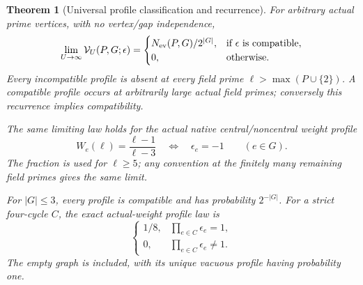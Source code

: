\documentclass[11pt]{article}
\newtheorem{theorem}{Theorem}[section]
\begin{document}
\begin{theorem}[Universal profile classification and recurrence]
\label{thm:native-vanishing-profiles}
For arbitrary actual prime vertices, with no vertex/gap independence,
\begin{equation}\label{eq:native-full-profile-law}
 \lim_{U\to\infty}\mathcal V_U(P,G;\epsilon)
 =
 \begin{cases}
  N_{\rm ev}(P,G)/2^{|G|},&\text{if \(\epsilon\) is compatible},\\
  0,&\text{otherwise}.
 \end{cases}
\end{equation}
Every incompatible profile is absent at every field prime
\(\ell>\max(P\cup\{2\})\).
A compatible profile occurs at arbitrarily large actual field primes;
conversely this recurrence implies compatibility.

The same limiting law holds for the actual native central/noncentral
weight profile
\[
 W_e(\ell)=\frac{\ell-1}{\ell-3}
       \quad\Longleftrightarrow\quad\epsilon_e=-1
       \qquad(e\in G).
\]
The fraction is used for \(\ell\geq5\); any convention at the finitely
many remaining field primes gives the same limit.

For \(|G|\leq3\), every profile is compatible and has probability
\(2^{-|G|}\). For a strict four-cycle \(C\), the exact actual-weight
profile law is
\[
 \begin{cases}
  1/8,&\prod_{e\in C}\epsilon_e=1,\\
  0,&\prod_{e\in C}\epsilon_e\ne1.
 \end{cases}
\]
The empty graph is included, with its unique vacuous profile having
probability one.
\end{theorem}
\end{document}
